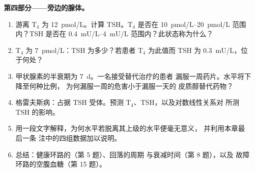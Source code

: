 \begin{problem}
\medskip
\noindent\textbf{第四部分——旁边的腺体。}
\begin{enumerate}[resume]
  \item 游离 T$_{4}$ 为 \qty{12}{pmol/L}。计算 TSH。T$_{4}$ 是否在
        \qtyrange{10}{20}{pmol/L} 范围内？TSH 是否在
        \qtyrange{0.4}{4}{mU/L} 范围内？此状态称为什么？
  \item T$_{4}$ 为 \qty{7}{pmol/L}：TSH 为多少？若患者 T$_{4}$ 为此值而
        TSH 为 \qty{0.3}{mU/L}，位于何处？
  \item 甲状腺素的半衰期为 \qty{7}{d}。一名接受替代治疗的患者
        漏服一周药片。水平将下降至何种比例，
        为何漏服一周的危害小于漏服一天的
        皮质醇替代药物？
  \item 格雷夫斯病：占据 TSH 受体。预测
        T$_{4}$、TSH，以及对数线性关系对
        所测 TSH 的影响。
  \item 用一段文字解释，为何水平若脱离其上级的水平便毫无意义，
        并利用本章最后一条
        注中的四组数据加以说明。
  \item 总结：健康环路的（第 5 题）、回落的周期
        与衰减时间（第 8 题），以及
        故障环路的空腹血糖（第 15 题）。
\end{enumerate}
\end{problem}
